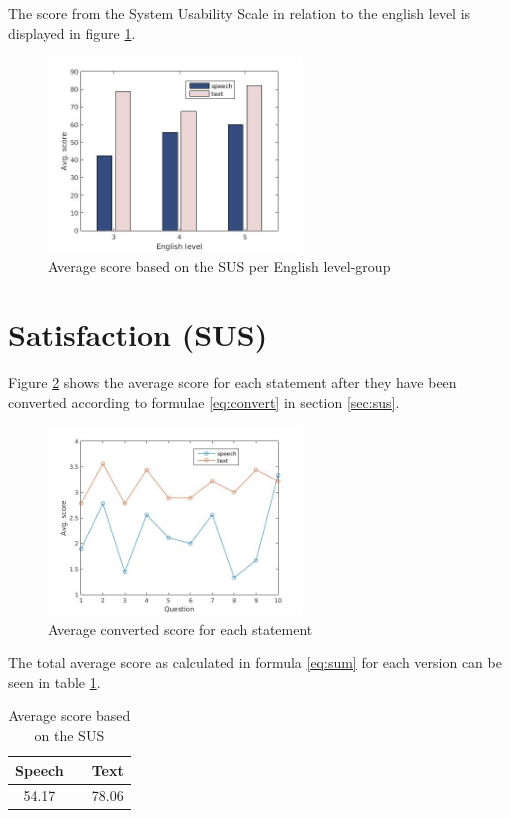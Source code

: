 The score from the System Usability Scale in relation to the english level is displayed in figure \ref{eng_score}.

\begin{figure}[ht]
  \centering
  \includegraphics[width=0.6\textwidth]{images/english_score.jpg}
  \caption{Average score based on the SUS per English level-group}\label{eng_score}
\end{figure}


\section{Satisfaction (SUS)}
Figure \ref{fig:sus_table} shows the average score for each statement after they have been converted according to formulae \ref{eq:convert} in section \ref{sec:sus}. 
\begin{figure}[ht]
  \centering
  \includegraphics[width=0.6\textwidth]{images/sus.jpg}
  \caption{Average converted score for each statement}\label{fig:sus_table}
\end{figure}

The total average score as calculated in formula \ref{eq:sum} for each version can be seen in table \ref{tot_score}.
\begin{table}[ht]
  \centering
  \begin{tabular}{ccc}
    \toprule
    Speech &   & Text\\
    \midrule
    54.17 &   & 78.06\\
    \bottomrule
  \end{tabular}
  \caption{Average score based on the SUS}\label{tot_score}
\end{table}